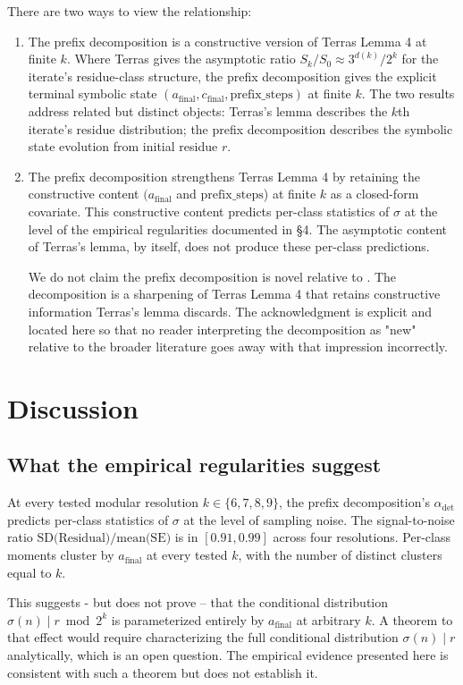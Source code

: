 \documentclass{article}
\theoremstyle{plain}
\begin{document}
There are two ways to view the relationship:
\begin{enumerate}
    \item The prefix decomposition is a constructive version of Terras Lemma 4 at finite $k$. Where Terras gives the asymptotic ratio $S_k / S_0 \approx 3^{d(k)} / 2^k$ for the iterate's residue-class structure, the prefix decomposition gives the explicit terminal symbolic state $(a_{\text{final}}, c_{\text{final}}, \text{prefix\_steps})$ at finite $k$. The two results address related but distinct objects: Terras's lemma describes the $k$th iterate's residue distribution; the prefix decomposition describes the symbolic state evolution from initial residue $r$.
    \item The prefix decomposition strengthens Terras Lemma 4 by retaining the constructive content $(a_{\text{final}}$ and $\text{prefix\_steps}$) at finite $k$ as a closed-form covariate. This constructive content predicts per-class statistics of $\sigma$ at the level of the empirical regularities documented in \S4. The asymptotic content of Terras's lemma, by itself, does not produce these per-class predictions.

    We do not claim the prefix decomposition is novel relative to \citep{terras1976}. The decomposition is a sharpening of Terras Lemma 4 that retains constructive information Terras's lemma discards. The acknowledgment is explicit and located here so that no reader interpreting the decomposition as "new" relative to the broader literature goes away with that impression incorrectly.
\end{enumerate}
\section{Discussion}
\subsection{What the empirical regularities suggest}
At every tested modular resolution $k \in \{6, 7, 8, 9\}$, the prefix decomposition's $\alpha_{\text{det}}$ predicts per-class statistics of $\sigma$ at the level of sampling noise. The signal-to-noise ratio $\text{SD(Residual)}/ \text{mean(SE)}$ is in $[0.91, 0.99]$ across four resolutions. Per-class moments cluster by $a_{\text{final}}$ at every tested $k$, with the number of distinct clusters equal to $k$.

This suggests - but does not prove -- that the conditional distribution $\sigma(n) \mid r \bmod 2^k$ is parameterized entirely by $a_{\text{final}}$ at arbitrary $k$. A theorem to that effect would require characterizing the full conditional distribution $\sigma(n) \mid r$ analytically, which is an open question. The empirical evidence presented here is consistent with such a theorem but does not establish it.
\end{document}
